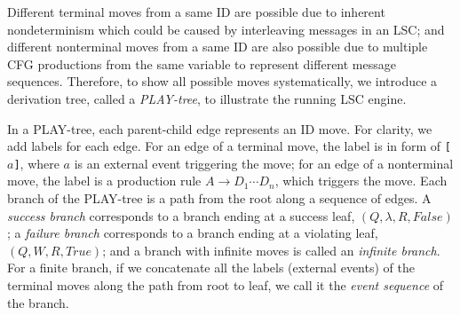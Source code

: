 \documentclass[]{llncs}
\begin{document}
Different terminal moves from a same ID are possible due to
inherent nondeterminism which could be caused by interleaving
messages in an LSC;
and different nonterminal moves from a same ID are also possible
due to multiple CFG productions from
the same variable to represent different message sequences. Therefore,
to show all possible moves systematically, we introduce
a derivation tree, called a {\em PLAY-tree}, to
illustrate the running LSC engine.

\iffalse
\begin{definition}[PLAY-tree]
Let $Sys$ be a system model, $Ls$ its LSC specification
and $G$ a context-free grammar. Then the {\em PLAY-tree}
for $(Sys, Ls, G)$ is defined as follows:
\begin{enumerate}
  \item Each node of the tree is an ID.
  \item The {\em root} node is $(Q_0, V_0, \emptyset, False)$,
where $Q_0$ is a set of initial system object states, $V_0$ is the start variable
    in the CFG $G$, and the empty set $\emptyset$ means no running LSCs at the initial state.
  \item Let $(Q, W, R, B)$ be a node in the tree. This node has an edge to
    a child   $(Q_1, W_1, R_1, B_1)$ for each possible move
    $(Q, W, R, B) \vdash (Q_1, W_1, R_1, B_1)$.
\item The following nodes have no children:
    $(Q, W, R, True)$, denoted as a {\em violating leaf} node,
    and $(Q, \lambda, R, False)$, denoted as a {\em success leaf} node.
\end{enumerate}
\label{def:play-tree}
\end{definition}
\fi


In a PLAY-tree, each parent-child edge represents an ID move. For clarity, we
add labels for each edge. For an edge of a terminal move, the label
is in form of {\tt [$a$]}, where $a$ is an external event triggering
the move; for an edge of a nonterminal move, the label is a production
rule $A \rightarrow D_1\cdots D_n$, which triggers the move.
Each branch of the PLAY-tree is a path from the root along a sequence of
edges. A {\em success branch} corresponds to a branch ending at a success leaf, $(Q, \lambda, R, False)$;
a {\em failure branch} corresponds to a branch ending at a violating leaf, $(Q, W, R, True)$;
and a branch with infinite moves is called an {\em infinite branch}.
For a finite branch, if we concatenate all the labels (external events)
of the terminal moves along the path from root to leaf, we call it
the {\em event sequence} of the branch.
\end{document}
